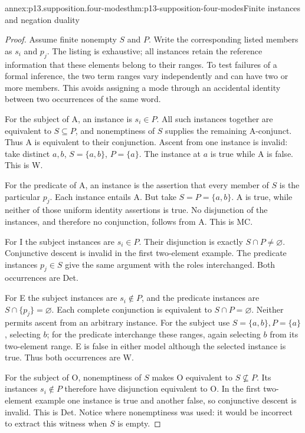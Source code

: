 \begin{annexitem}{annex:p13.supposition.four-modes}{thm:p13-supposition-four-modes}{Finite instances and negation duality}
\begin{proof}
Assume finite nonempty \(S\) and \(P\). Write the corresponding
listed members as \(s_i\) and \(p_j\). The listing is exhaustive;
all instances retain the reference information that these elements
belong to their ranges. To test failures of a formal inference, the
two term ranges vary independently and can have two or more members.
This avoids assigning a mode through an accidental identity between
two occurrences of the same word.

For the subject of A, an instance is \(s_i\in P\). All such
instances together are equivalent to \(S\subseteq P\), and
nonemptiness of \(S\) supplies the remaining A-conjunct. Thus A is
equivalent to their conjunction. Ascent from one instance is invalid:
take distinct \(a,b\), \(S=\{a,b\}\), \(P=\{a\}\).
The instance at \(a\) is true while A is false. This is W.

For the predicate of A, an instance is the assertion that every member
of \(S\) is the particular \(p_j\). Each instance entails A.
But take \(S=P=\{a,b\}\). A is true, while neither of those
uniform identity assertions is true. No disjunction of the instances,
and therefore no conjunction, follows from A. This is MC.

For I the subject instances are \(s_i\in P\). Their disjunction
is exactly \(S\cap P\ne\varnothing\). Conjunctive descent is
invalid in the first two-element example. The predicate instances
\(p_j\in S\) give the same argument with the roles interchanged.
Both occurrences are Det.

For E the subject instances are \(s_i\notin P\), and the
predicate instances are \(S\cap\{p_j\}=\varnothing\).
Each complete conjunction is equivalent to \(S\cap P=\varnothing\).
Neither permits ascent from an arbitrary instance. For the subject
use \(S=\{a,b\},P=\{a\}\), selecting \(b\); for the
predicate interchange these ranges, again selecting \(b\) from its
two-element range. E is false in either model although the selected
instance is true. Thus both occurrences are W.

For the subject of O, nonemptiness of \(S\) makes O equivalent to
\(S\nsubseteq P\). Its instances \(s_i\notin P\) therefore
have disjunction equivalent to O. In the first two-element example
one instance is true and another false, so conjunctive descent is
invalid. This is Det. Notice where nonemptiness was used: it would
be incorrect to extract this witness when \(S\) is empty.


\end{proof}
\end{annexitem}
